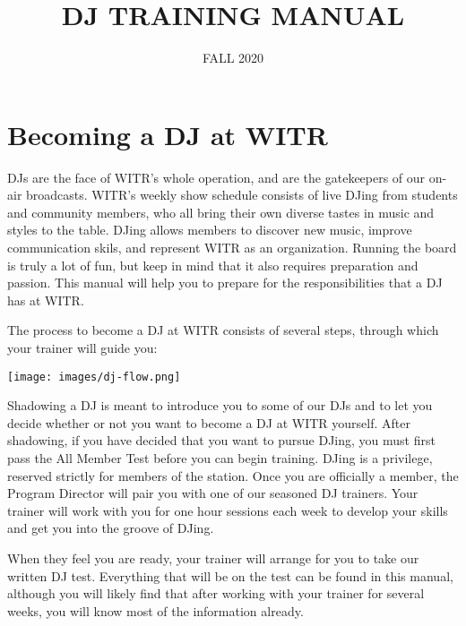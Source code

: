 \documentclass{witrman}
\title{DJ TRAINING MANUAL}
\date{FALL 2020}
\begin{document}
\maketitle

\maketoc{}

\setpagebg{}


\chapter{Becoming a DJ at WITR}

DJs are the face of WITR's whole operation, and are the gatekeepers of our
on-air broadcasts.  WITR's weekly show schedule consists of live DJing from
students and community members, who all bring their own diverse tastes in music
and styles to the table.  DJing allows members to discover new music, improve
communication skils, and represent WITR as an organization.  Running the board
is truly a lot of fun, but keep in mind that it also requires preparation and
passion.  This manual will help you to prepare for the responsibilities that a
DJ has at WITR\@.

The process to become a DJ at WITR consists of several steps, through which your
trainer will guide you:

\texttt{[image: images/dj-flow.png]}

Shadowing a DJ is meant to introduce you to some of our DJs and to let you
decide whether or not you want to become a DJ at WITR yourself.  After
shadowing, if you have decided that you want to pursue DJing, you
must first pass the All Member Test before you can begin training.  DJing is a
privilege, reserved strictly for members of the station.  Once you are
officially a member, the Program Director will pair you with one of our seasoned
DJ trainers.  Your trainer will work with you for one hour sessions each week
to develop your skills and get you into the groove of DJing.

When they feel you are ready, your trainer will arrange for you to take our
written DJ test.  Everything that will be on the test can be found in this
manual, although you will likely find that after working with your trainer for
several weeks, you will know most of the information already.
\end{document}
